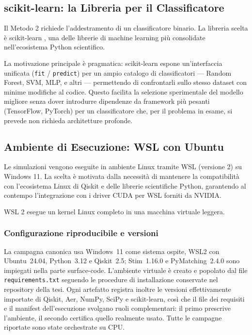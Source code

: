 \begin{onehalfspace}
\subsection{scikit-learn: la Libreria per il Classificatore}
\label{sec:scikit}

Il Metodo 2 richiede l'addestramento di un classificatore binario. La libreria scelta è scikit-learn \cite{scikit_learn}, una delle librerie di machine learning più consolidate nell'ecosistema Python scientifico.

La motivazione principale è pragmatica: scikit-learn espone un'interfaccia unificata (\texttt{fit} / \texttt{predict}) per un ampio catalogo di classificatori — Random Forest, \ac{SVM}, \ac{MLP}, e altri — permettendo di confrontarli sullo stesso dataset con minime modifiche al codice. Questo facilita la selezione sperimentale del modello migliore senza dover introdurre dipendenze da framework più pesanti (TensorFlow, PyTorch) per un classificatore che, per il problema in esame, si prevede non richieda architetture profonde.

\subsection{Ambiente di Esecuzione: WSL con Ubuntu}
\label{sec:wsl}

Le simulazioni vengono eseguite in ambiente Linux tramite \ac{WSL} (versione 2) su Windows 11. La scelta è motivata dalla necessità di mantenere la compatibilità con l'ecosistema Linux di Qiskit e delle librerie scientifiche Python, garantendo al contempo l'integrazione con i driver CUDA per \ac{WSL} forniti da NVIDIA.

\ac{WSL} 2 esegue un kernel Linux completo in una macchina virtuale leggera.

\subsubsection{Configurazione riproducibile e versioni}
\label{app:ambiente_versioni}

La campagna canonica usa Windows~11 come sistema ospite, \ac{WSL}2 con Ubuntu~24.04,
Python~3.12 e Qiskit~2.5; Stim~1.16.0 e PyMatching~2.4.0 sono impiegati nella parte
surface-code. L'ambiente virtuale è creato e popolato dal file
\texttt{requirements.txt} seguendo le procedure
di installazione conservate nel repository della tesi. Ogni artefatto registra inoltre
le versioni effettivamente importate di Qiskit, Aer, NumPy, SciPy e scikit-learn, così
che il file dei requisiti e il manifest dell'esecuzione svolgano ruoli complementari:
il primo prescrive l'ambiente, il secondo certifica quello realmente usato. Tutte le
campagne riportate sono state orchestrate su CPU.

\end{onehalfspace}


